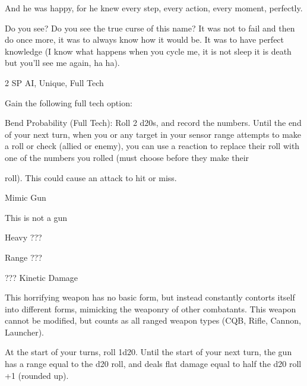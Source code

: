 And he was happy, for he knew every step, every action, every moment, perfectly.

Do you see? Do you see the true curse of this name? It was not to fail and then do once more, it was to
always know how it would be. It was to have perfect knowledge (I know what happens when you cycle me,
it is not sleep it is death but you’ll see me again, ha ha).

2 SP
AI, Unique, Full Tech

Gain the following full tech option:


	        Bend Probability (Full Tech): Roll 2 d20s, and record the numbers. Until the end of your next turn,
when you or any target in your sensor range attempts to make a roll or check (allied or enemy), you can
use a reaction to replace their roll with one of the numbers you rolled (must choose before they make their

roll). This could cause an attack to hit or miss.


Mimic Gun

This is not a gun

Heavy ???

Range ???

??? Kinetic Damage


This horrifying weapon has no basic form, but instead constantly contorts itself into different
forms, mimicking the weaponry of other combatants. This weapon cannot be modified, but
counts as all ranged weapon types (CQB, Rifle, Cannon, Launcher).


At the start of your turns, roll 1d20. Until the start of your next turn, the gun has a range equal to
the d20 roll, and deals flat damage equal to half the d20 roll +1 (rounded up).
